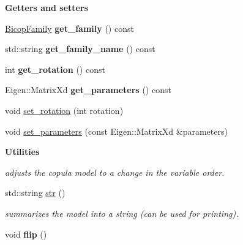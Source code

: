 \begin{Indent}{\bf Getters and setters}\par
\begin{DoxyCompactItemize}
\item 
\hyperlink{namespacevinecopulib_a42e95cc06d33896199caab0c11ad44f3}{Bicop\+Family} {\bfseries get\+\_\+family} () const \hypertarget{classvinecopulib_1_1_bicop_a68ab3556ee3bb3d02814fd978573bf3b}{}\label{classvinecopulib_1_1_bicop_a68ab3556ee3bb3d02814fd978573bf3b}

\item 
std\+::string {\bfseries get\+\_\+family\+\_\+name} () const \hypertarget{classvinecopulib_1_1_bicop_a4d4fbc0fdca17564c23f4814d5d2fbe7}{}\label{classvinecopulib_1_1_bicop_a4d4fbc0fdca17564c23f4814d5d2fbe7}

\item 
int {\bfseries get\+\_\+rotation} () const \hypertarget{classvinecopulib_1_1_bicop_ab8e52577a50fbfc57277f9240d8eac03}{}\label{classvinecopulib_1_1_bicop_ab8e52577a50fbfc57277f9240d8eac03}

\item 
Eigen\+::\+Matrix\+Xd {\bfseries get\+\_\+parameters} () const \hypertarget{classvinecopulib_1_1_bicop_a93ab0dd89826e50b209ea3760f251f2f}{}\label{classvinecopulib_1_1_bicop_a93ab0dd89826e50b209ea3760f251f2f}

\item 
void \hyperlink{classvinecopulib_1_1_bicop_a4e359624560a089273b25dc74879bd16}{set\+\_\+rotation} (int rotation)
\item 
void \hyperlink{classvinecopulib_1_1_bicop_ac8d1d4266b0fd7e2f971d0149f881ef9}{set\+\_\+parameters} (const Eigen\+::\+Matrix\+Xd \&parameters)
\end{DoxyCompactItemize}
\end{Indent}
\begin{Indent}{\bf Utilities}\par
{\em adjust\textquotesingle{}s the copula model to a change in the variable order. }\begin{DoxyCompactItemize}
\item 
std\+::string \hyperlink{classvinecopulib_1_1_bicop_a94b889d56f478dbeb156be4e31af5de5}{str} ()\hypertarget{classvinecopulib_1_1_bicop_a94b889d56f478dbeb156be4e31af5de5}{}\label{classvinecopulib_1_1_bicop_a94b889d56f478dbeb156be4e31af5de5}

\begin{DoxyCompactList}\small\item\em summarizes the model into a string (can be used for printing). \end{DoxyCompactList}\item 
void {\bfseries flip} ()\hypertarget{classvinecopulib_1_1_bicop_a59b7087b3857350df25ff684ab96f377}{}\label{classvinecopulib_1_1_bicop_a59b7087b3857350df25ff684ab96f377}

\end{DoxyCompactItemize}
\end{Indent}


